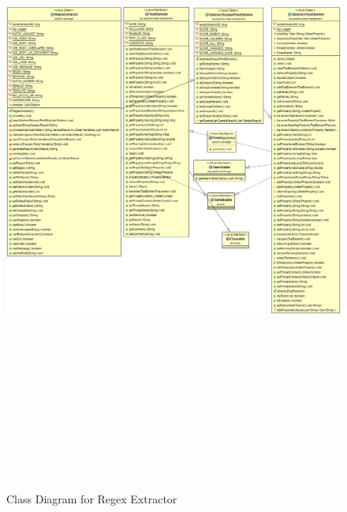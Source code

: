 \documentclass[12pt]{book}
\begin{document}
  \begin{figure}[H]
   \centering
   \includegraphics[width=17cm, height=22cm]{images/postprocessor_regex}
   \caption{Class Diagram for Regex Extractor\label{fig:fig9_JMeter}}
  \end{figure}
  
\end{document}
